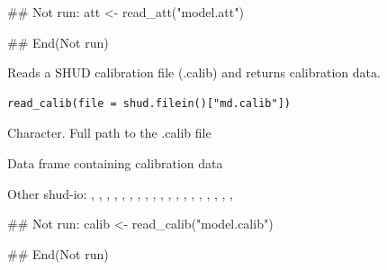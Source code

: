 \documentclass[a4paper]{book}
\begin{document}
%
\begin{Examples}
\begin{ExampleCode}
## Not run: 
att <- read_att("model.att")

## End(Not run)
\end{ExampleCode}
\end{Examples}
%
\begin{Description}\relax
Reads a SHUD calibration file (.calib) and returns calibration data.
\end{Description}
%
\begin{Usage}
\begin{verbatim}
read_calib(file = shud.filein()["md.calib"])
\end{verbatim}
\end{Usage}
%
\begin{Arguments}
\begin{ldescription}
\item[\code{file}] Character. Full path to the .calib file
\end{ldescription}
\end{Arguments}
%
\begin{Value}
Data frame containing calibration data
\end{Value}
%
\begin{SeeAlso}\relax
Other shud-io: 
,
,
,
,
,
,
,
,
,
,
,
,
,
,
,
,
,
,
,
\end{SeeAlso}
%
\begin{Examples}
\begin{ExampleCode}
## Not run: 
calib <- read_calib("model.calib")

## End(Not run)
\end{ExampleCode}
\end{Examples}
\end{document}
